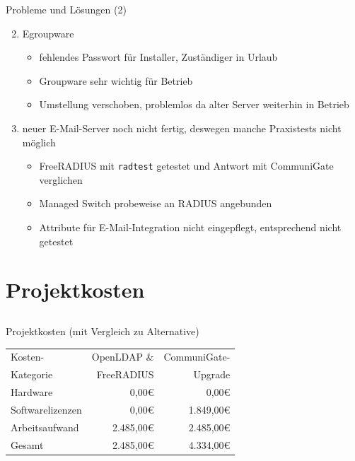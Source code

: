 \documentclass[handout,svgnames]{beamer}
\newcommand{\mcc}[2]{\multicolumn{#1}{|c|}{#2}} %
\begin{document}
\begin{frame}{Probleme und Lösungen (2)}
\begin{enumerate}
	\setcounter{enumi}{1}
	\item Egroupware
	\begin{itemize}
		\item fehlendes Passwort für Installer, Zuständiger in Urlaub
		\item Groupware sehr wichtig für Betrieb
		\item Umstellung verschoben, problemlos da alter Server weiterhin in Betrieb
	\end{itemize}
	\item neuer E-Mail-Server noch nicht fertig, deswegen manche Praxistests nicht möglich
	\begin{itemize}
		\item FreeRADIUS mit \texttt{radtest} getestet und Antwort mit CommuniGate verglichen
		\item Managed Switch probeweise an RADIUS angebunden
		\item Attribute für E-Mail-Integration nicht eingepflegt, entsprechend nicht getestet
	\end{itemize}
\end{enumerate}
\end{frame}


\section{Projektkosten}
\subsection{}
\begin{frame}{Projektkosten (mit Vergleich zu Alternative)}
\begin{table}
\centering
	\begin{tabularx}{0.8\textwidth}{|X|r|r|}
		\hline
		Kosten-	&	OpenLDAP \& &	CommuniGate-\\
		Kategorie	&	FreeRADIUS &	Upgrade\\
		\hline
		Hardware &	0,00\euro{} &	0,00\euro{}\\
		\hline
		Softwarelizenzen &	0,00\euro{} &	1.849,00\euro{}\\
		\hline
		Arbeitsaufwand &	2.485,00\euro{} &	2.485,00\euro{}\\
		\hhline{|=|=|=|}
		Gesamt &	2.485,00\euro{} &	4.334,00\euro{}\\
		\hline
	\end{tabularx}
\end{table}
\end{frame}
\end{document}
